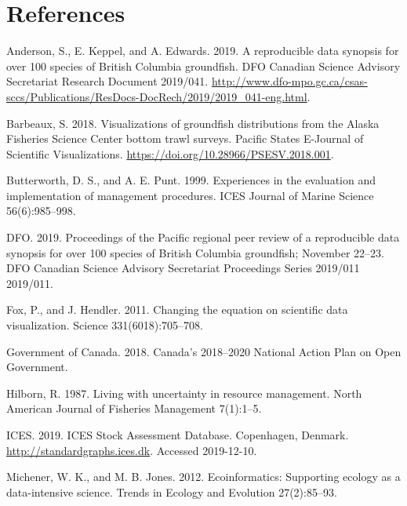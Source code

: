 \documentclass[12pt,]{article}
\begin{document}
\hypertarget{references}{%
\section*{References}\label{references}}

\hypertarget{refs}{}
\leavevmode\hypertarget{ref-anderson2019synopsis}{}%
Anderson, S., E. Keppel, and A. Edwards. 2019. A reproducible data synopsis for over 100 species of British Columbia groundfish. DFO Canadian Science Advisory Secretariat Research Document 2019/041. \url{http://www.dfo-mpo.gc.ca/csas-sccs/Publications/ResDocs-DocRech/2019/2019_041-eng.html}.

\leavevmode\hypertarget{ref-barbeaux2018}{}%
Barbeaux, S. 2018. Visualizations of groundfish distributions from the Alaska Fisheries Science Center bottom trawl surveys. Pacific States E-Journal of Scientific Visualizations. \url{https://doi.org/10.28966/PSESV.2018.001}.

\leavevmode\hypertarget{ref-butterworth1999}{}%
Butterworth, D. S., and A. E. Punt. 1999. Experiences in the evaluation and implementation of management procedures. ICES Journal of Marine Science 56(6):985--998.

\leavevmode\hypertarget{ref-dfo2019synopsis}{}%
DFO. 2019. Proceedings of the Pacific regional peer review of a reproducible data synopsis for over 100 species of British Columbia groundfish; November 22--23. DFO Canadian Science Advisory Secretariat Proceedings Series 2019/011 2019/011.

\leavevmode\hypertarget{ref-fox2011}{}%
Fox, P., and J. Hendler. 2011. Changing the equation on scientific data visualization. Science 331(6018):705--708.

\leavevmode\hypertarget{ref-canada2018}{}%
Government of Canada. 2018. Canada's 2018--2020 National Action Plan on Open Government.

\leavevmode\hypertarget{ref-hilborn1987}{}%
Hilborn, R. 1987. Living with uncertainty in resource management. North American Journal of Fisheries Management 7(1):1--5.

\leavevmode\hypertarget{ref-ices2019}{}%
ICES. 2019. ICES Stock Assessment Database. Copenhagen, Denmark. \url{http://standardgraphs.ices.dk}. Accessed 2019-12-10.

\leavevmode\hypertarget{ref-michener2012}{}%
Michener, W. K., and M. B. Jones. 2012. Ecoinformatics: Supporting ecology as a data-intensive science. Trends in Ecology and Evolution 27(2):85--93.
\end{document}
